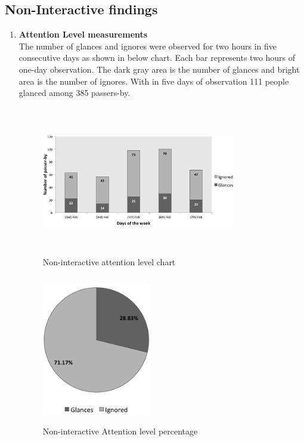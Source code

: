 \subsection{Non-Interactive findings}

\begin{enumerate}

\item \textbf{Attention Level measurements} \\
The number of glances and ignores were observed for two hours in five consecutive days as shown in below chart. Each bar represents two hours of one-day observation. The dark gray area is the number of glances and bright area is the number of ignores. With in five days of observation 111 people glanced among 385 passers-by. 

\begin{figure}[H]
    \centering
    \includegraphics[width=0.8\textwidth,height=6.5cm]{Figures/8/non_inter_findings/Non_Inter_chart}%
    \caption{Non-interactive attention level chart}%
    \label{fig:Nonattentionlevelchart}%
\end{figure}


\begin{figure}[H]
    \centering
    \includegraphics[width=0.45\textwidth,height=6.5cm]{Figures/8/non_inter_findings/non_inter_percentage}
    \caption{Non-interactive Attention level percentage}%
    \label{fig:Nonattentionlevelpercentage}%
\end{figure}


\end{enumerate}

